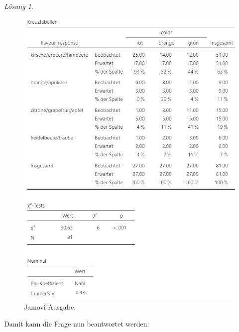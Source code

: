 \documentclass[
]{book}
\theoremstyle{definition}
\theoremstyle{definition}
\theoremstyle{definition}
\theoremstyle{definition}
\theoremstyle{remark}
\newtheorem*{solution}{Lösung}
\begin{document}
\begin{solution}
\begin{figure}
{\centering \includegraphics{figures/10-exr-taste-color-jmv-output} 

}

\caption{Jamovi Ausgabe.}\label{fig:sol-taste-color-output}
\end{figure}

Damit kann die Frage nun beantwortet werden:


\end{solution}
\end{document}
